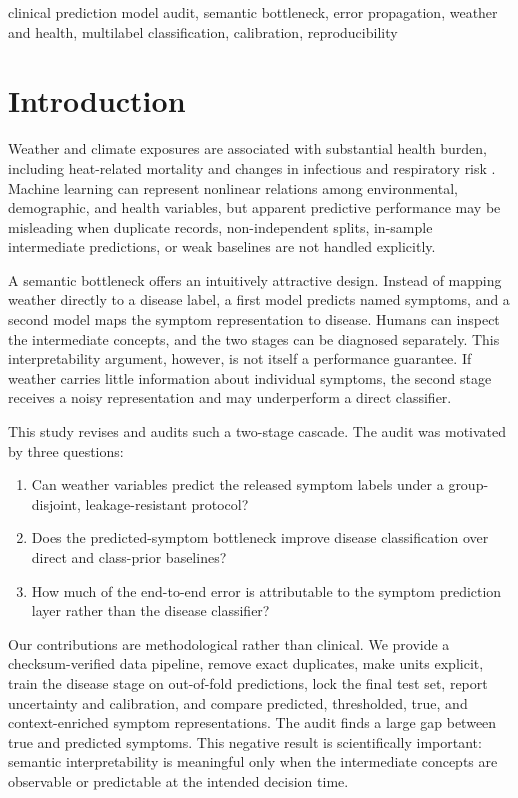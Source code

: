 \documentclass[conference]{IEEEtran}
\begin{document}
\begin{IEEEkeywords}
clinical prediction model audit, semantic bottleneck, error propagation,
weather and health, multilabel classification, calibration, reproducibility
\end{IEEEkeywords}

\section{Introduction}

Weather and climate exposures are associated with substantial health burden,
including heat-related mortality and changes in infectious and respiratory
risk \cite{vicedo2021}. Machine learning can represent nonlinear relations
among environmental, demographic, and health variables, but apparent
predictive performance may be misleading when duplicate records, non-independent
splits, in-sample intermediate predictions, or weak baselines are not handled
explicitly.

A semantic bottleneck offers an intuitively attractive design. Instead of
mapping weather directly to a disease label, a first model predicts named
symptoms, and a second model maps the symptom representation to disease.
Humans can inspect the intermediate concepts, and the two stages can be
diagnosed separately. This interpretability argument, however, is not itself a
performance guarantee. If weather carries little information about individual
symptoms, the second stage receives a noisy representation and may underperform
a direct classifier.

This study revises and audits such a two-stage cascade. The audit was motivated
by three questions:

\begin{enumerate}
    \item Can weather variables predict the released symptom labels under a
    group-disjoint, leakage-resistant protocol?
    \item Does the predicted-symptom bottleneck improve disease classification
    over direct and class-prior baselines?
    \item How much of the end-to-end error is attributable to the symptom
    prediction layer rather than the disease classifier?
\end{enumerate}

Our contributions are methodological rather than clinical. We provide a
checksum-verified data pipeline, remove exact duplicates, make units explicit,
train the disease stage on out-of-fold predictions, lock the final test set,
report uncertainty and calibration, and compare predicted, thresholded, true,
and context-enriched symptom representations. The audit finds a large gap
between true and predicted symptoms. This negative result is scientifically
important: semantic interpretability is meaningful only when the intermediate
concepts are observable or predictable at the intended decision time.
\end{document}
